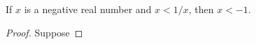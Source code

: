 
\begin{theorem}
  If $x$ is a negative real number and $x < 1/x$, then $x < -1$.
\end{theorem}

\begin{proof}
  Suppose
\end{proof}



\begin{align*}
\end{align*}
